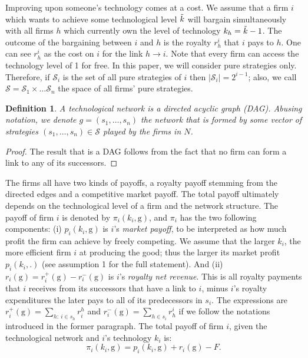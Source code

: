 \documentclass{article}
\newtheorem{definition}{Definition}
\begin{document}
\indent Improving upon someone's technology comes at a cost. We assume that a firm $i$ which wants to achieve some technological level $\Tilde{k}$ will bargain simultaneously with all firms $h$ which currently own the level of technology $k_h=\Tilde{k}-1$. The outcome of the bargaining between $i$ and $h$ is the royalty $r^{i}_h$ that $i$ pays to $h$. One can see $r^{i}_h$ as the cost on $i$ for the link $h\rightarrow i$. Note that every firm can access the technology level of 1 for free. In this paper, we will consider pure strategies only. Therefore, if $\mathcal{S}_i$ is the set of all pure strategies of $i$ then $|\mathcal{S}_i|=2^{i-1}$; also, we call $\mathcal{S}=\mathcal{S}_1\times\ldots \mathcal{S}_n$ the space of all firms' pure strategies.  \\


%

%

%


\begin{definition}
A technological network  is a directed acyclic graph (DAG). Abusing notation, we denote $g=(s_1,\dots, s_n)$ the network that is formed by some vector of strategies $(s_1,\ldots, s_n)\in \mathcal{S}$ played by the firms in $N$. 
\end{definition}
\begin{proof}
The result that  is a DAG follows from the fact that no firm can form a link to any of its successors. 
\end{proof}



\indent The firms all have two kinds of payoffs, a royalty payoff stemming from the directed edges and a competitive market payoff. The total payoff ultimately depends on the technological level of a firm and the network structure. The payoff of firm $i$ is denoted by $\pi_i(k_i,\text{g})$, and $\pi_i$ has the two following components: (i) $p_i(k_i,\text{g})$ is $i$'s \textit{market payoff}, to be interpreted as how much profit the firm can achieve by freely competing. We assume that the larger $k_i$, the more efficient firm $i$ at producing the good; thus the larger its market profit $p_i(k_i,.)$ (see assumption 1 for the full statement). And (ii) $r_i(\text{g})=r_i^+(\text{g})-r_i^-(\text{g})$ is $i$'s \textit{royalty net revenue}. This is all royalty payments that $i$ receives from its successors that have a link to $i$, minus $i$'s royalty expenditures the later pays to all of its predecessors in $s_i$. The expressions are $r^+_i(\text{g})=\sum_{h:~ i\in s_h}r^h_i$ and $r^-_i(\text{g})=\sum_{h\in s_i} r^{i}_h$ if we follow the notations introduced in the former paragraph. The total payoff of firm $i$, given the technological network  and $i$'s technology $k_i$ is: 
\begin{equation}
    \pi_i(k_i,\text{g})=p_i(k_i,\text{g})+r_i(\text{g}) -F. 
\end{equation}
\end{document}

